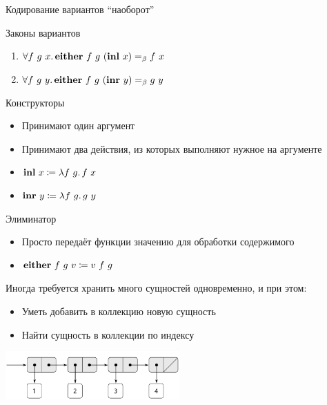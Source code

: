     \begin{frame}[fragile]{Кодирование вариантов ``наоборот''}
        \begin{block}{Законы вариантов}
            \begin{enumerate}
                \item $\forall f~g~x \ldotp \mathbf{either} ~ f ~ g ~ (\mathbf{inl} ~ x) =_\beta f ~ x$
                \item $\forall f~g~y \ldotp \mathbf{either} ~ f ~ g ~ (\mathbf{inr} ~ y) =_\beta g ~ y$
            \end{enumerate}
        \end{block}
        \pause
        \begin{block}{Конструкторы}
            \begin{itemize}
                \item Принимают один аргумент
                \item Принимают два действия, из которых выполняют нужное на аргументе
                \item $\mathbf{inl} ~ x \coloneqq \lambda f~g \ldotp f ~ x$
                \item $\mathbf{inr} ~ y \coloneqq \lambda f~g \ldotp g ~ y$
            \end{itemize}
        \end{block}
        \pause
        \begin{block}{Элиминатор}
            \begin{itemize}
                \item Просто передаёт функции значению для обработки содержимого
                \item $\mathbf{either} ~ f ~ g ~ v \coloneqq v ~ f ~ g$
            \end{itemize}
        \end{block}
    \end{frame}


    \begin{frame}{\subsecname}
        Иногда требуется хранить много сущностей одновременно, и при этом:
        \begin{itemize}
            \item Уметь добавить в коллекцию новую сущность
            \item Найти сущность в коллекции по индексу
        \end{itemize}
        \vspace{0.5em}
        \begin{center}
            \includegraphics[width=0.5\textwidth]{figs/list}
        \end{center}
    \end{frame}

